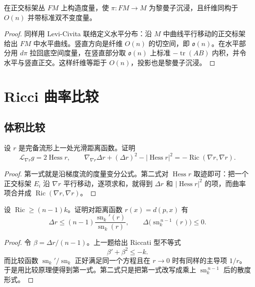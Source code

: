 \documentclass[11pt,a4paper,openany]{ctexbook}
\numberwithin{equation}{chapter}
\begin{document}
\begin{problem}
在正交标架丛 \(FM\) 上构造度量，使 \(\pi\colon FM\to M\) 为黎曼子沉浸，且纤维同构于 \(O(n)\) 并带标准双不变度量。
\end{problem}
\begin{proof}
同样用 Levi-Civita 联络定义水平分布：沿 \(M\) 中曲线平行移动的正交标架给出 \(FM\) 中水平曲线。竖直方向是纤维 \(O(n)\) 的切空间，即 \(\mathfrak o(n)\)。在水平部分用 \(d\pi\) 拉回底空间度量，在竖直部分取 \(\mathfrak o(n)\) 上标准 \(-\operatorname{tr}(AB)\) 内积，并令水平与竖直正交。这样纤维等距于 \(O(n)\)，投影也是黎曼子沉浸。
\end{proof}

\chapter{Ricci 曲率比较}

\section{体积比较}

\begin{problem}
设 \(r\) 是完备流形上一处光滑距离函数。证明
\[
\mathcal L_{\nabla r}g=2\operatorname{Hess}r,\qquad
\nabla_{\nabla r}\Delta r+(\Delta r)^2-|{\operatorname{Hess}r}|^2=-\operatorname{Ric}(\nabla r,\nabla r).
\]
\end{problem}
\begin{proof}
第一式就是沿梯度流的度量变分公式。第二式对 \(\operatorname{Hess}r\) 取迹即可：把一个正交标架 \(E_i\) 沿 \(\nabla r\) 平行移动，逐项求和，就得到 \(\Delta r\) 和 \(|\operatorname{Hess}r|^2\) 的项，而曲率项合并成 \(\operatorname{Ric}(\nabla r,\nabla r)\)。
\end{proof}

\begin{problem}
设 \(\operatorname{Ric}\ge (n-1)k\)。证明对距离函数 \(r(x)=d(p,x)\) 有
\[
\Delta r\le (n-1)\frac{\operatorname{sn}_k'(r)}{\operatorname{sn}_k(r)},
\qquad
\Delta\bigl(\operatorname{sn}_k^{\,n-1}(r)\bigr)\le 0.
\]
\end{problem}
\begin{proof}
令 \(\beta=\Delta r/(n-1)\)。上一题给出 Riccati 型不等式
\[
\beta'+\beta^2\le -k.
\]
而比较函数 \(\operatorname{sn}_k'/\operatorname{sn}_k\) 正好满足同一个方程且在 \(r\to0\) 时有同样的主导项 \(1/r\)。于是用比较原理便得到第一式。第二式只是把第一式改写成乘上 \(\operatorname{sn}_k^{\,n-1}\) 后的散度形式。
\end{proof}
\end{document}
